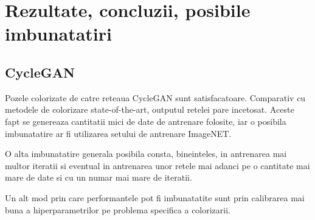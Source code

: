 \documentclass[12pt]{article}
\theoremstyle{definition}
\begin{document}
\section{Rezultate, concluzii, posibile imbunatatiri}

\subsection{CycleGAN}

Pozele colorizate de catre reteaua CycleGAN sunt satisfacatoare. Comparativ cu metodele de colorizare state-of-the-art, outputul retelei pare incetosat.
Aceste fapt se genereaza cantitatii mici de date de antrenare folosite, iar o posibila imbunatatire ar fi utilizarea setului de antrenare ImageNET.

O alta imbunatatire generala posibila consta, bineinteles, in antrenarea mai multor iteratii si eventual in antrenarea unor retele mai adanci pe o cantitate mai mare de date si cu un numar mai mare de iteratii.

Un alt mod prin care performantele pot fi imbunatatite sunt prin calibrarea mai buna a  hiperparametrilor pe problema specifica a colorizarii.
\end{document}
